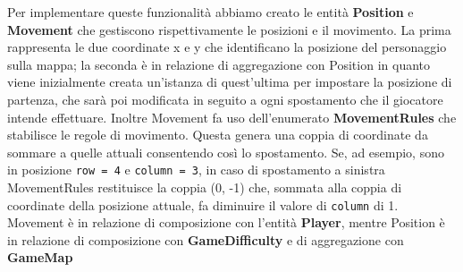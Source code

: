 \documentclass[12pt, letterpaper]{article}
\begin{document}
            Per implementare queste funzionalità abbiamo creato le entità \textbf{Position} e \textbf{Movement} che gestiscono rispettivamente le posizioni e il movimento. La prima rappresenta le due coordinate x e y che identificano la posizione del personaggio sulla mappa; la seconda è in relazione di aggregazione con Position in quanto viene inizialmente creata un'istanza di quest'ultima per impostare la posizione di partenza, che sarà poi modificata in seguito a ogni spostamento che il giocatore intende effettuare. Inoltre Movement fa uso dell'enumerato \textbf{MovementRules} che stabilisce le regole di movimento. Questa genera una coppia di coordinate da sommare a quelle attuali consentendo così lo spostamento. Se, ad esempio, sono in posizione \verb|row = 4| e \verb|column = 3|, in caso di spostamento a sinistra MovementRules restituisce la coppia (0, -1) che, sommata alla coppia di coordinate della posizione attuale, fa diminuire il valore di \verb|column| di 1.
            \\
            Movement è in relazione di composizione con l'entità \textbf{Player}, mentre Position è in relazione di composizione con \textbf{GameDifficulty} e di aggregazione con \textbf{GameMap}
\end{document}
